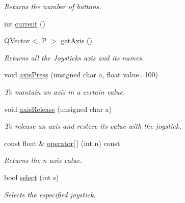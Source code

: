 \begin{DoxyCompactItemize}
\begin{DoxyCompactList}\small\item\em Returns the number of buttons. \end{DoxyCompactList}\item 
int \hyperlink{class_x_joystick_a69ccd5ca34996e0e6b5b99ea7ddb4a5f}{current} ()
\item 
Q\+Vector$<$ \hyperlink{class_x_joystick_acad1887250d6f70a997cd7b1e5bbba8a}{P} $>$ \hyperlink{class_x_joystick_ac72effd86a10e586deb6418db0b794fe}{get\+Axis} ()
\begin{DoxyCompactList}\small\item\em Returns all the Joystick\textquotesingle{}s axis and it\textquotesingle{}s names. \end{DoxyCompactList}\item 
void \hyperlink{class_x_joystick_a436e8cb1940316d7ba3d0dd8d1f6002b}{axis\+Press} (unsigned char a, float value=100)
\begin{DoxyCompactList}\small\item\em To mantain an axis in a certain value. \end{DoxyCompactList}\item 
void \hyperlink{class_x_joystick_a55531560621ea0aedf9cf7f123294c79}{axis\+Release} (unsigned char a)
\begin{DoxyCompactList}\small\item\em To release an axis and restore it\textquotesingle{}s value with the joystick. \end{DoxyCompactList}\item 
const float \& \hyperlink{class_x_joystick_afc3d48cab266b9596182229eb0df4384}{operator\mbox{[}$\,$\mbox{]}} (int n) const 
\begin{DoxyCompactList}\small\item\em Returns the \textquotesingle{}n\textquotesingle{} axis value. \end{DoxyCompactList}\item 
bool \hyperlink{class_x_joystick_abfc58c4863c6ae9a4b4b1169114903e0}{select} (int s)
\begin{DoxyCompactList}\small\item\em Selects the especified joystick. \end{DoxyCompactList}\end{DoxyCompactItemize}
